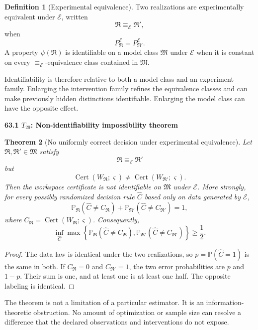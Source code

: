 \documentclass[11pt,letterpaper]{article}
\newcommand{\subtopic}[1]{%
 \vspace{0.45em}
 {\bfseries\color{AccentColor} #1\par}
}
\theoremstyle{plain}
\newtheorem{theorem}{Theorem}
\theoremstyle{definition}
\newtheorem{definition}[theorem]{Definition}
\begin{document}
\begin{definition}[Experimental equivalence]
Two realizations are experimentally equivalent under \(\mathcal E\), written
\[
\mathfrak R\equiv_{\mathcal E}\mathfrak R',
\]
when
\[
P_{\mathfrak R}^{\mathcal E}
=
P_{\mathfrak R'}^{\mathcal E}.
\]
A property \(\psi(\mathfrak R)\) is identifiable on a model class
\(\mathfrak M\) under \(\mathcal E\) when it is constant on every
\(\equiv_{\mathcal E}\)-equivalence class contained in \(\mathfrak M\).
\end{definition}

Identifiability is therefore relative to both a model class and an experiment
family. Enlarging the intervention family refines the equivalence classes and
can make previously hidden distinctions identifiable. Enlarging the model
class can have the opposite effect.

\subtopic{63.1 \(T_{29}\): Non-identifiability impossibility theorem}

\begin{theorem}[No uniformly correct decision under experimental equivalence]
\label{thm:workspace-nonidentifiability}
Let \(\mathfrak R,\mathfrak R'\in\mathfrak M\) satisfy
\[
\mathfrak R\equiv_{\mathcal E}\mathfrak R'
\]
but
\[
\operatorname{Cert}(W_{\mathfrak R};\varsigma)
\neq
\operatorname{Cert}(W_{\mathfrak R'};\varsigma).
\]
Then the workspace certificate is not identifiable on \(\mathfrak M\) under
\(\mathcal E\). More strongly, for every possibly randomized decision rule
\(\widehat C\) based only on data generated by \(\mathcal E\),
\[
\boxed{
\mathbb P_{\mathfrak R}
\left(
\widehat C\neq C_{\mathfrak R}
\right)
+
\mathbb P_{\mathfrak R'}
\left(
\widehat C\neq C_{\mathfrak R'}
\right)
=1,
}
\]
where \(C_{\mathfrak R}=\operatorname{Cert}(W_{\mathfrak R};\varsigma)\).
Consequently,
\[
\inf_{\widehat C}
\max\left\{
\mathbb P_{\mathfrak R}(\widehat C\neq C_{\mathfrak R}),
\mathbb P_{\mathfrak R'}(\widehat C\neq C_{\mathfrak R'})
\right\}
\geq\frac12.
\]
\end{theorem}

\begin{proof}
The data law is identical under the two realizations, so
\(p=\mathbb P(\widehat C=1)\) is the same in both. If
\(C_{\mathfrak R}=0\) and \(C_{\mathfrak R'}=1\), the two error probabilities
are \(p\) and \(1-p\). Their sum is one, and at least one is at least one half.
The opposite labeling is identical.
\end{proof}

The theorem is not a limitation of a particular estimator. It is an
information-theoretic obstruction. No amount of optimization or sample size
can resolve a difference that the declared observations and interventions do
not expose.
\end{document}
